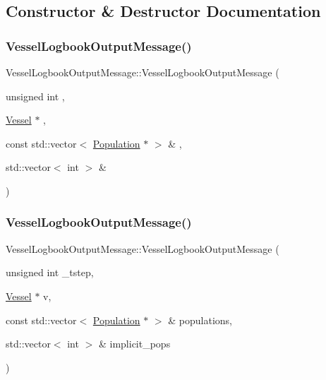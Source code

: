 \subsection{Constructor \& Destructor Documentation}
\mbox{\label{class_vessel_logbook_output_message_a8e148fec26b9f18b7a1e48e068efc0ff}} 
\subsubsection{\texorpdfstring{VesselLogbookOutputMessage()}{VesselLogbookOutputMessage()}\hspace{0.1cm}{\footnotesize\ttfamily [1/2]}}
{\footnotesize\ttfamily Vessel\+Logbook\+Output\+Message\+::\+Vessel\+Logbook\+Output\+Message (\begin{DoxyParamCaption}\item[{unsigned int}]{,  }\item[{\mbox{\hyperlink{class_vessel}{Vessel}} $\ast$}]{,  }\item[{const std\+::vector$<$ \mbox{\hyperlink{class_population}{Population}} $\ast$ $>$ \&}]{,  }\item[{std\+::vector$<$ int $>$ \&}]{ }\end{DoxyParamCaption})\hspace{0.3cm}{\ttfamily [inline]}}

\mbox{\label{class_vessel_logbook_output_message_a2ddba61c5e80afc0745f275562328bf4}} 
\subsubsection{\texorpdfstring{VesselLogbookOutputMessage()}{VesselLogbookOutputMessage()}\hspace{0.1cm}{\footnotesize\ttfamily [2/2]}}
{\footnotesize\ttfamily Vessel\+Logbook\+Output\+Message\+::\+Vessel\+Logbook\+Output\+Message (\begin{DoxyParamCaption}\item[{unsigned int}]{\+\_\+tstep,  }\item[{\mbox{\hyperlink{class_vessel}{Vessel}} $\ast$}]{v,  }\item[{const std\+::vector$<$ \mbox{\hyperlink{class_population}{Population}} $\ast$ $>$ \&}]{populations,  }\item[{std\+::vector$<$ int $>$ \&}]{implicit\+\_\+pops }\end{DoxyParamCaption})}



